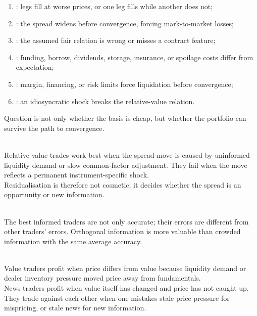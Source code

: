 \begin{taxonomy} 
\begin{enumerate}[label=\roman*.]
\setlength{\itemsep}{0pt}
\item {}: legs fill at worse prices, or one leg fills while another does not;
\item {}: the spread widens before convergence, forcing mark-to-market losses;
\item {}: the assumed fair relation is wrong or misses a contract feature;
\item {}: funding, borrow, dividends, storage, insurance, or spoilage costs differ from expectation;
\item {}: margin, financing, or risk limits force liquidation before convergence;
\item {}: an idiosyncratic shock breaks the relative-value relation.
\end{enumerate}
Question is not only whether the basis is cheap, but whether the portfolio can survive the path to convergence.
\end{taxonomy}

\begin{principle} \\
Relative-value trades work best when the spread move is caused by uninformed liquidity demand or slow common-factor adjustment. They fail when the move reflects a permanent instrument-specific shock.\\
Residualisation is therefore not cosmetic; it decides whether the spread is an opportunity or new information.
\end{principle}

\begin{principle} \\
The best informed traders are not only accurate; their errors are different from other traders' errors. Orthogonal information is more valuable than crowded information with the same average accuracy.
\end{principle}

\begin{principle} \\
Value traders profit when price differs from value because liquidity demand or dealer inventory pressure moved price away from fundamentals.\\
News traders profit when value itself has changed and price has not caught up. They trade against each other when one mistakes stale price pressure for mispricing, or stale news for new information.
\end{principle}

